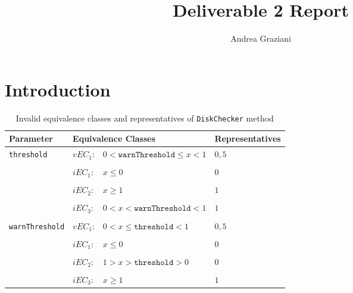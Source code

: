 \documentclass[sigchi]{acmart}
\begin{document}
\title{Deliverable 2 Report}

\author{Andrea Graziani}

\renewcommand{\shortauthors}{Andrea Graziani (0273395)}


\maketitle

\section{Introduction}

\begin{table*}
  \caption{Invalid equivalence classes and representatives of \texttt{DiskChecker} method}
  \label{tab:libraries}
  \begin{tabular}{l|lp{5cm}|p{5cm}}
    \toprule
    \textbf{Parameter} & \multicolumn{2}{l|}{\textbf{Equivalence Classes}} & \textbf{Representatives} \\
    \midrule
    
	\multirow{3}{*}{\texttt{threshold}} & $vEC_1$: & $0 < \texttt{warnThreshold} \leq x < 1$  & $0,5$ \\    
    
    \\[-1em] 
    & $iEC_1$: & $x \leq 0$ & $0$ \\ 
    
    \\[-1em]
    & $iEC_2$: & $x \geq 1$ & $1$ \\
    
    \\[-1em]
    & $iEC_3$: & $0 < x < \texttt{warnThreshold} < 1$ & $1$ \\
    
    \\[-1em] \hline 
	   
    \multirow{3}{*}{\texttt{warnThreshold}} & $vEC_1$: & $0 < x \leq \texttt{threshold} < 1 $  & $0,5$ \\    
    
    \\[-1em] 
    & $iEC_1$: & $x \leq 0$ & $0$ \\ 
    
	\\[-1em] 
    & $iEC_2$: & $1 > x > \texttt{threshold} > 0$ & $0$ \\  
    
    \\[-1em] 
    & $iEC_3$: & $x \geq 1$ & $1$ \\    
    
    \bottomrule
  \end{tabular}
\end{table*}
\end{document}
